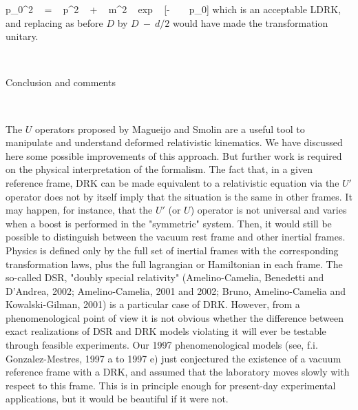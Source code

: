 \documentclass[a4paper,12pt,dvips]{article}
\makeatletter
\renewcommand{\section}{\@startsection{section}{1}{0in}
	{0.4\baselineskip}{0.1\baselineskip}{\Large\bf}}
\makeatother
\begin{document}
\equation
p_{0}^2 ~ = ~ p^2 ~ + ~ m^2 ~ exp ~ [- ~ \mu ~ p_0]
\endequation
\noindent
which is an acceptable LDRK, and replacing as before $D$ by $D ~ - ~ d/2$
would have made the transformation unitary.

~ 

\section{Conclusion and comments}
\label{concl.sec}
\vspace{0.5ex}

~

The $U$ operators proposed by Magueijo and Smolin are a useful tool to manipulate and understand deformed relativistic kinematics. We have discussed here some possible improvements of this approach. But further work is required on the physical interpretation of the formalism. The fact that, in a given reference frame, DRK can be made equivalent to a relativistic equation via the $U'$ operator does not by itself imply that the situation is the same in other frames. It may happen, for instance, that the $U'$ (or $U$) operator is not universal and varies when a boost is performed in the "symmetric" system. Then, it would still be possible to distinguish between the vacuum rest frame and other inertial frames. Physics is defined only by the full set of inertial frames with the corresponding transformation laws, plus the full lagrangian or Hamiltonian in each frame. The so-called DSR, "doubly special relativity" (Amelino-Camelia, Benedetti and D'Andrea, 2002; Amelino-Camelia, 2001 and 2002; Bruno, Amelino-Camelia and Kowalski-Gilman, 2001) is a particular case of DRK. However, from a phenomenological point of view it is not obvious whether the difference between exact realizations of DSR and DRK models violating it will ever be testable through feasible experiments. Our 1997 phenomenological models (see, f.i. Gonzalez-Mestres, 1997 a to 1997 e) just conjectured the existence of a vacuum reference frame with a DRK, and assumed that the laboratory moves slowly with respect to this frame. This is in principle enough for present-day experimental applications, but it would be beautiful if it were not.

~ 
\end{document}

